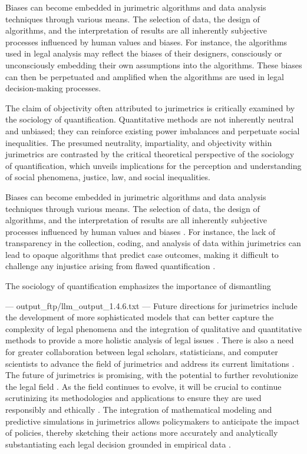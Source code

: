 Biases can become embedded in jurimetric algorithms and data analysis techniques through various means. The selection of data, the design of algorithms, and the interpretation of results are all inherently subjective processes influenced by human values and biases. For instance, the algorithms used in legal analysis may reflect the biases of their designers, consciously or unconsciously embedding their own assumptions into the algorithms. These biases can then be perpetuated and amplified when the algorithms are used in legal decision-making processes.

The claim of objectivity often attributed to jurimetrics is critically examined by the sociology of quantification. Quantitative methods are not inherently neutral and unbiased; they can reinforce existing power imbalances and perpetuate social inequalities. The presumed neutrality, impartiality, and objectivity within jurimetrics are contrasted by the critical theoretical perspective of the sociology of quantification, which unveils implications for the perception and understanding of social phenomena, justice, law, and social inequalities.

Biases can become embedded in jurimetric algorithms and data analysis techniques through various means. The selection of data, the design of algorithms, and the interpretation of results are all inherently subjective processes influenced by human values and biases \cite{10.1007/s11186-021-09453-1,de2010jurimetrics}. For instance, the lack of transparency in the collection, coding, and analysis of data within jurimetrics can lead to opaque algorithms that predict case outcomes, making it difficult to challenge any injustice arising from flawed quantification \cite{10.5040/9781350220645,10.1590/data.2022.65.3.267}.

The sociology of quantification emphasizes the importance of dismantling


---
output_ftp/llm_output_1.4.6.txt
---
Future directions for jurimetrics include the development of more sophisticated models that can better capture the complexity of legal phenomena and the integration of qualitative and quantitative methods to provide a more holistic analysis of legal issues \cite{ribeiro2021quantification}. There is also a need for greater collaboration between legal scholars, statisticians, and computer scientists to advance the field of jurimetrics and address its current limitations \cite{103390fi9040068}. The future of jurimetrics is promising, with the potential to further revolutionize the legal field \cite{10.1057/s41599-020-00557-0,10.5040/9781350220645}. As the field continues to evolve, it will be crucial to continue scrutinizing its methodologies and applications to ensure they are used responsibly and ethically \cite{10.1057/s41599-020-00557-0,10.5040/9781350220645}. The integration of mathematical modeling and predictive simulations in jurimetrics allows policymakers to anticipate the impact of policies, thereby sketching their actions more accurately and analytically substantiating each legal decision grounded in empirical data \cite{10.1057/s41599-020-00557-0,10.5040/9781350220645}.

